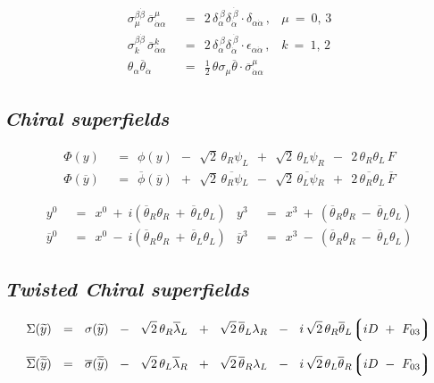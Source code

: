 \documentclass[14pt]{article}
\newcommand{\wt}{\widetilde}
\newcommand{\ov}{\overline}
\newcommand{\lgr}{\left\lgroup}
\newcommand{\rgr}{\right\rgroup}
\begin{document}
\begin{align*}
	\sigma_\mu^{\beta\dot\beta}\, \ov\sigma_{\dot\alpha\alpha}^\mu & ~~=~~ 
					2\, \delta_\alpha^{\ \beta} \delta_{\dot\alpha}^{\ \dot\beta} \cdot
						\delta_{\alpha\dot\alpha}\,,
	&
	\mu ~=~ 0,\, 3 
	\\[2mm]
	\sigma_k^{\beta\dot\beta}\, \ov\sigma_{\dot\alpha\alpha}^k & ~~=~~
					2\, \delta_\alpha^{\ \beta} \delta_{\dot\alpha}^{\ \dot\beta} \cdot
						\epsilon_{\alpha\dot\alpha}\,,
	&
	k ~=~ 1,\, 2 
	\\[1mm]
	\theta_\alpha \ov\theta_{\dot\alpha} & ~~=~~ 
		\frac{1}{2}\, \theta\sigma_\mu\ov{\theta} \cdot \ov{\sigma}_{\dot\alpha\alpha}^\mu
\end{align*}


\pagebreak
\subsection*{\centering\it Chiral superfields}
\begin{align*}
	\Phi(y)    & ~~=~~    \phi(y)  ~~-~~  \sqrt{2}\, \theta_R \psi_L
                                       ~~+~~  \sqrt{2}\, \theta_L \psi_R  ~~-~~  2\, \theta_R\theta_L\, F
	\\[2mm]
	\Phi(\ov y)    & ~~=~~    \ov\phi(\ov y)  ~~+~~  \sqrt{2}\, \ov{\theta_R \psi}{}_L
                                                  ~~-~~  \sqrt{2}\, \ov{\theta_L \psi}{}_R
                                                  ~~+~~  2\, \ov{\theta_R \theta}{}_L\, \ov{F}
\end{align*}

\begin{align*}
	y^0    & ~~=~~  x^0  ~+~ i \left( \ov\theta{}_R\theta_R  ~+~  \ov\theta{}_L\theta_L \right)
	&
	y^3    & ~~=~~  x^3  ~+~ \left( \ov\theta{}_R\theta_R  ~-~  \ov\theta{}_L\theta_L \right)
	\\[2mm]
	\ov y{}^0    & ~~=~~   x^0  ~-~ i \left( \ov\theta{}_R\theta_R  ~+~  \ov\theta{}_L\theta_L \right)
	&
	\ov y{}^3    & ~~=~~   x^3  ~-~ \left( \ov\theta{}_R\theta_R  ~-~  \ov\theta{}_L\theta_L \right)
\end{align*}

\vspace{2mm}
\subsection*{\centering \it Twisted Chiral superfields}
\begin{align*}
	\Sigma(\wt y)    & ~~=~~    \sigma(\wt y)  ~~-~~  \sqrt{2}\, \theta_R \ov\lambda{}_L
						   ~~+~~  \sqrt{2}\, \ov\theta{}_L \lambda_R
						   ~~-~~  i\, \sqrt{2}\, \theta_R \ov\theta{}_L\! \lgr iD ~+~ F_{03} \rgr
	\\[2mm]
	\ov\Sigma(\ov{\wt y})    & ~~=~~    \ov\sigma(\ov{\wt y})  ~~-~~ \sqrt{2}\, \theta_L \ov\lambda{}_R
								   ~~+~~ \sqrt{2}\, \ov\theta{}_R \lambda_L
								   ~~-~~ i\, \sqrt{2}\, \theta_L \ov\theta{}_R\! \lgr iD ~-~ F_{03} \rgr
\end{align*}
\end{document}
